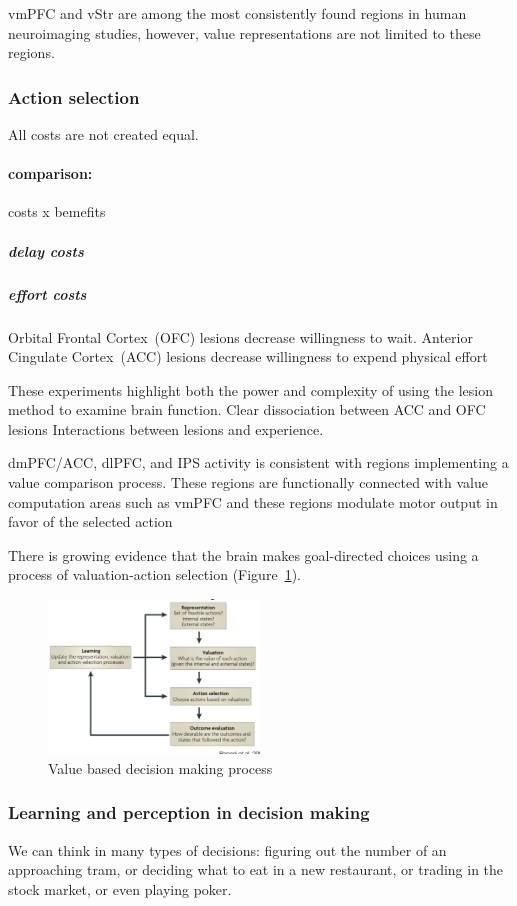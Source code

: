 \documentclass[12pt,article,oneside,a4paper]{memoir}
\begin{document}
vmPFC and vStr are among the most consistently found regions in human
neuroimaging studies, however, value representations are not limited to these
regions.

\subsubsection{Action selection}
All costs are not created equal.

\paragraph{comparison:} costs x bemefits
\subparagraph{delay costs}
\subparagraph{effort costs}

Orbital Frontal Cortex~(OFC) lesions decrease willingness to wait.
Anterior Cingulate Cortex~(ACC) lesions decrease willingness to expend physical effort

These experiments highlight both the power and complexity of using the lesion
method to examine brain function. Clear dissociation between ACC and OFC lesions
Interactions between lesions and experience.

dmPFC/ACC, dlPFC, and IPS activity is consistent with regions implementing a
value comparison process. These regions are functionally connected with value
computation areas such as vmPFC and these regions modulate motor output in favor
of the selected action

There is growing evidence that the brain makes goal-directed choices using a
process of valuation-action selection (Figure~\ref{fig:decision-making}).

\begin{figure}
  \centering
  \includegraphics[width=0.5\textwidth]{imgs/value-based-decision-making.png}
  \caption{Value based decision making process}
  \label{fig:decision-making}
\end{figure}

\subsubsection{Learning and perception in decision making}
We can think in many types of decisions: figuring out the number of an approaching
tram, or deciding what to eat in a new restaurant, or trading in the stock market,
or even playing poker.
\end{document}
